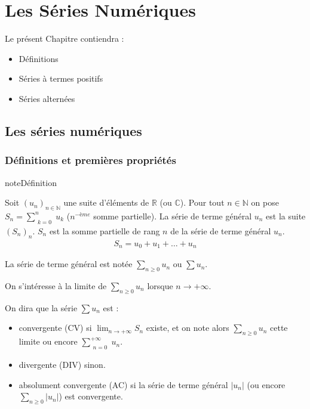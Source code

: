 \documentclass[letterpaper,10pt,french]{sphinxmanual}
\begin{document}
\chapter{Les Séries Numériques}
\label{\detokenize{Seriesc:les-series-numeriques}}\label{\detokenize{Seriesc::doc}}
\sphinxAtStartPar
Le présent Chapitre contiendra :
\begin{itemize}
\item {} 
\sphinxAtStartPar
Définitions

\item {} 
\sphinxAtStartPar
Séries à termes positifs

\item {} 
\sphinxAtStartPar
Séries alternées

\end{itemize}


\section{Les séries numériques}
\label{\detokenize{series:les-series-numeriques}}\label{\detokenize{series::doc}}

\subsection{Définitions et premières propriétés}
\label{\detokenize{series:definitions-et-premieres-proprietes}}
\begin{sphinxadmonition}{note}{Définition}

\sphinxAtStartPar
Soit \((u_n)_{n\in\mathbb N}\) une suite d’éléments de \(\mathbb R\) (ou \(\mathbb C\)). Pour tout \(n\in\mathbb N\) on pose \(S_n= \sum_{\substack{k=0}}^n u_k\) (\(n^{-ème}\) somme partielle). La série de terme général \(u_n\) est la suite \((S_n)_n\). \(S_n\) est la somme partielle de rang \(n\) de la série de terme général \(u_n\).
\begin{equation*}
\begin{split}
S_n=u_0+u_1+\dots+u_n
\end{split}
\end{equation*}\end{sphinxadmonition}

\sphinxAtStartPar
La série de terme général est notée \(\sum_{n\geq 0} u_n\) ou \(\sum u_n\).

\sphinxAtStartPar
On s’intéresse à la limite de \(\sum_{n\geq 0} u_n\) lorsque \(n\to +\infty\).

\sphinxAtStartPar
On dira que la série \(\sum u_n\) est :
\begin{itemize}
\item {} 
\sphinxAtStartPar
convergente (CV) si \(\lim_{n\to +\infty} S_n\) existe, et on note alors \(\sum_{n\geq 0}u_n\) cette limite ou encore \(\sum_{\substack{n=0}}^{+\infty}u_n\).

\item {} 
\sphinxAtStartPar
divergente (DIV) sinon.

\item {} 
\sphinxAtStartPar
absolument convergente (AC) si la série de terme général \(|u_n|\) (ou encore \(\sum_{n\geq 0} |u_n|\)) est convergente.

\end{itemize}
\end{document}
